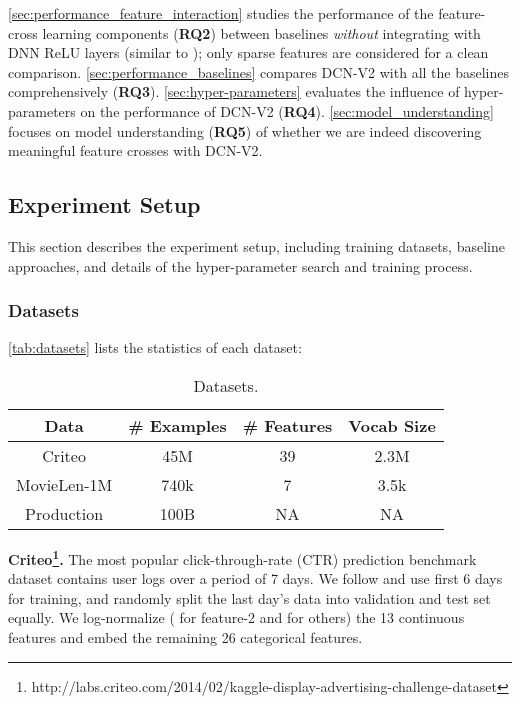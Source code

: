 \documentclass[sigconf]{acmart}
\begin{document}
\autoref{sec:performance_feature_interaction} studies the performance of the feature-cross learning components (\textbf{RQ2}) between baselines \emph{without} integrating with DNN ReLU layers (similar to \cite{lian2018xdeepfm, song2019autoint}); only sparse features are considered for a clean comparison. \autoref{sec:performance_baselines} compares {DCN-V2} with all the baselines comprehensively (\textbf{RQ3}). \autoref{sec:hyper-parameters} evaluates the influence of hyper-parameters on the performance of {DCN-V2} (\textbf{RQ4}). \autoref{sec:model_understanding} focuses on model understanding (\textbf{RQ5}) of whether we are indeed discovering meaningful feature crosses with {DCN-V2}. 


\subsection{Experiment Setup}
\label{sec:experiment_setup}
This section describes the experiment setup, including training datasets, baseline approaches, and details of the hyper-parameter search and training process.
\subsubsection{Datasets}
\autoref{tab:datasets} lists the statistics of each dataset:


\begin{table}[htpb]
\small
\caption{Datasets.}
\vspace{-3.5ex}
\label{tab:datasets}
\begin{center}
\begin{tabular}{c|ccc}
\toprule
{\bf Data} & \# Examples & \# Features & Vocab Size \\
\midrule
Criteo & 45M & 39 & 2.3M\\
MovieLen-1M &  740k & 7 & 3.5k\\
Production &  100B & NA & NA\\
\bottomrule
\end{tabular}
\end{center}
\end{table}

{\bf Criteo\footnote{http://labs.criteo.com/2014/02/kaggle-display-advertising-challenge-dataset}.} The most popular click-through-rate (CTR) prediction benchmark dataset contains user logs over a period of 7 days. We follow \cite{wang2017deep, song2019autoint} and use first 6 days for training, and randomly split the last day's data into validation and test set equally. We log-normalize ( for feature-2 and  for others) the 13 continuous features and embed the remaining 26 categorical features.
\end{document}
